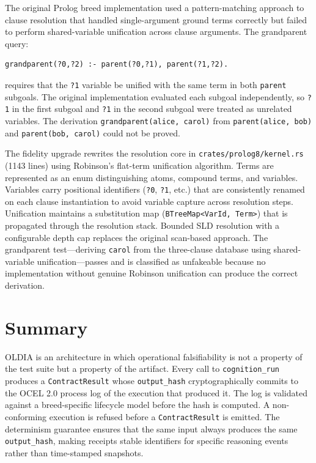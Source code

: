 The original Prolog breed implementation used a pattern-matching approach to clause resolution that handled single-argument ground terms correctly but failed to perform shared-variable unification across clause arguments. The grandparent query:

\begin{verbatim}
grandparent(?0,?2) :- parent(?0,?1), parent(?1,?2).
\end{verbatim}

requires that the \texttt{?1} variable be unified with the same term in both \texttt{parent} subgoals. The original implementation evaluated each subgoal independently, so \texttt{?1} in the first subgoal and \texttt{?1} in the second subgoal were treated as unrelated variables. The derivation \texttt{grandparent(alice, carol)} from \texttt{parent(alice, bob)} and \texttt{parent(bob, carol)} could not be proved.

The fidelity upgrade rewrites the resolution core in \texttt{crates/prolog8/kernel.rs} (1143 lines) using Robinson's flat-term unification algorithm. Terms are represented as an enum distinguishing atoms, compound terms, and variables. Variables carry positional identifiers (\texttt{?0}, \texttt{?1}, etc.) that are consistently renamed on each clause instantiation to avoid variable capture across resolution steps. Unification maintains a substitution map (\texttt{BTreeMap<VarId, Term>}) that is propagated through the resolution stack. Bounded SLD resolution with a configurable depth cap replaces the original scan-based approach. The grandparent test---deriving \texttt{carol} from the three-clause database using shared-variable unification---passes and is classified as unfakeable because no implementation without genuine Robinson unification can produce the correct derivation.

\section{Summary}
\label{sec:framework-summary}

OLDIA is an architecture in which operational falsifiability is not a property of the test suite but a property of the artifact. Every call to \texttt{cognition\_run} produces a \texttt{ContractResult} whose \texttt{output\_hash} cryptographically commits to the OCEL 2.0 process log of the execution that produced it. The log is validated against a breed-specific lifecycle model before the hash is computed. A non-conforming execution is refused before a \texttt{ContractResult} is emitted. The determinism guarantee ensures that the same input always produces the same \texttt{output\_hash}, making receipts stable identifiers for specific reasoning events rather than time-stamped snapshots.

